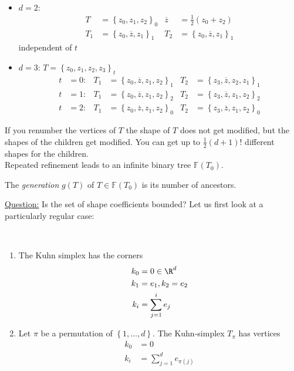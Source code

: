 \begin{example}\
	\begin{itemize}
		\item $d=2$:
			\begin{align*}
				T &= \left\{ z_{0},z_{1},z_{2} \right\}_{0} & \overline{z}&= \frac{1}{2}\left(z_{0} + z_{2} \right)\\
				T_{1} &= \left\{ z_{0},\overline{z},z_{1} \right\}_{1}  & T_{2} &= \left\{ z_{0},\overline{z},z_{1} \right\}_{1}
			\end{align*}
			independent of $t$
			
		\item $d= 3$: \quad $T = \left\{ z_{0},z_{1},z_{2},z_{3} \right\}_{t}$
			\begin{align*}
				t&=0: & T_{1}&= \left\{ z_{0},\overline{z}, z_{1},z_{2} \right\}_{1} & T_{2}&= \left\{ z_{3},\overline{z}, z_{2},z_{1} \right\}_{1}\\
				t&=1: & T_{1}&= \left\{ z_{0},\overline{z}, z_{1},z_{2} \right\}_{2} & T_{2}&= \left\{ z_{3},\overline{z}, z_{1},z_{2} \right\}_{2}\\
				t&=2: & T_{1}&= \left\{ z_{0},\overline{z}, z_{1},z_{2} \right\}_{0} & T_{2}&= \left\{ z_{3},\overline{z}, z_{1},z_{2} \right\}_{0}
			\end{align*}
	\end{itemize}
\end{example}
If you renumber the vertices of $T$ the shape of $T$ does not get modified, but the shapes of the children get modified. You can get up to $\frac{1}{2}\left(d+1 \right)!$ different shapes for the children.\\
Repeated refinement leads to an infinite binary tree $\mathbb{F}(T_{0})$.
\begin{definition}
	The \textit{generation} $g(T)$ of $T \in \mathbb{F}(T_{0})$ is its number of ancestors.
\end{definition}
\underline{Question:} Is the set of shape coefficients bounded?\nl
Let us first look at a particularly regular case:
\begin{definition}\
	\begin{enumerate}[label = \Roman*)]
		\item The Kuhn simplex has the corners
			\begin{align*}
				k_{0}&=0 \in \R^d\\
				k_{1}&=e_{1}, k_{2}=e_{2}\\
				k_{i}&= \sum_{j=1}^{i} e_{j}
			\end{align*}
			
		\item Let $\pi$ be a permutation of $\left\{1,\dots ,d \right\}$. The Kuhn-simplex $T_{\pi}$ has vertices
			\begin{align*}
				k_{0}&=0 \\
				k_{i}&= \sum_{j=1}^{d} e_{\pi(j)}
			\end{align*}		
	\end{enumerate}
\end{definition}
